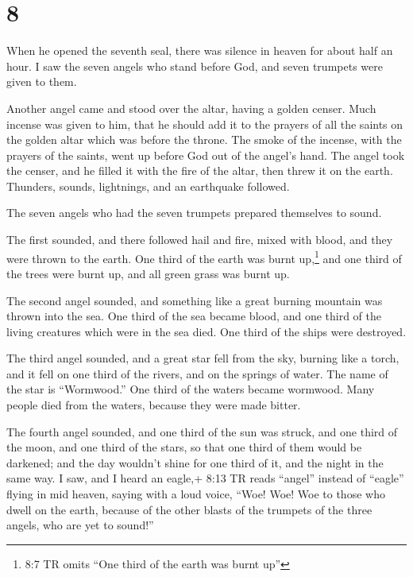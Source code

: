 \hypertarget{section-7}{%
\section{8}\label{section-7}}

 When he opened the seventh seal, there was silence in
heaven for about half an hour.  I saw the seven angels who
stand before God, and seven trumpets were given to them.

 Another angel came and stood over the altar, having a
golden censer. Much incense was given to him, that he should add it to
the prayers of all the saints on the golden altar which was before the
throne.  The smoke of the incense, with the prayers of the
saints, went up before God out of the angel's hand.  The
angel took the censer, and he filled it with the fire of the altar, then
threw it on the earth. Thunders, sounds, lightnings, and an earthquake
followed.

 The seven angels who had the seven trumpets prepared
themselves to sound.

 The first sounded, and there followed hail and fire, mixed
with blood, and they were thrown to the earth. One third of the earth
was burnt up,\footnote{8:7 TR omits ``One third of the earth was burnt
  up''} and one third of the trees were burnt up, and all green grass
was burnt up.

 The second angel sounded, and something like a great
burning mountain was thrown into the sea. One third of the sea became
blood,  and one third of the living creatures which were in
the sea died. One third of the ships were destroyed.

 The third angel sounded, and a great star fell from the
sky, burning like a torch, and it fell on one third of the rivers, and
on the springs of water.  The name of the star is
``Wormwood.'' One third of the waters became wormwood. Many people died
from the waters, because they were made bitter.

 The fourth angel sounded, and one third of the sun was
struck, and one third of the moon, and one third of the stars, so that
one third of them would be darkened; and the day wouldn't shine for one
third of it, and the night in the same way.  I saw, and I
heard an eagle,+ 8:13 TR reads ``angel'' instead of ``eagle'' flying in
mid heaven, saying with a loud voice, ``Woe! Woe! Woe to those who dwell
on the earth, because of the other blasts of the trumpets of the three
angels, who are yet to sound!''

